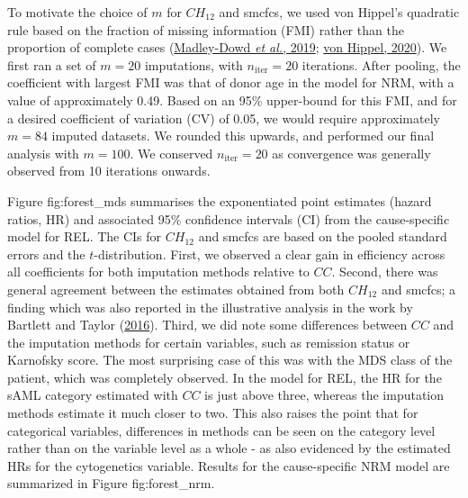 \documentclass[
  letterpaper,
  DIV=11,
  numbers=noendperiod]{scrreprt}
\begin{document}
To motivate the choice of \(m\) for \(CH_{12}\) and smcfcs, we used von
Hippel's quadratic rule based on the fraction of missing information
(FMI) rather than the proportion of complete cases
(\protect\hyperlink{ref-madley-dowdProportionMissingData2019}{Madley-Dowd
\emph{et al.}, 2019};
\protect\hyperlink{ref-vonhippelHowManyImputations2020}{von Hippel,
2020}). We first ran a set of \(m = 20\) imputations, with
\(n_{\text{iter}} = 20\) iterations. After pooling, the coefficient with
largest FMI was that of donor age in the model for NRM, with a value of
approximately 0.49. Based on an 95\% upper-bound for this FMI, and for a
desired coefficient of variation (CV) of 0.05, we would require
approximately \(m = 84\) imputed datasets. We rounded this upwards, and
performed our final analysis with \(m = 100\). We conserved
\(n_{\text{iter}} = 20\) as convergence was generally observed from 10
iterations onwards.

Figure fig:forest\_mds summarises the exponentiated point estimates
(hazard ratios, HR) and associated 95\% confidence intervals (CI) from
the cause-specific model for REL. The CIs for \(CH_{12}\) and smcfcs are
based on the pooled standard errors and the \(t\)-distribution. First,
we observed a clear gain in efficiency across all coefficients for both
imputation methods relative to \(CC\). Second, there was general
agreement between the estimates obtained from both \(CH_{12}\) and
smcfcs; a finding which was also reported in the illustrative analysis
in the work by Bartlett and Taylor
(\protect\hyperlink{ref-bartlettMissingCovariatesCompeting2016}{2016}).
Third, we did note some differences between \(CC\) and the imputation
methods for certain variables, such as remission status or Karnofsky
score. The most surprising case of this was with the MDS class of the
patient, which was completely observed. In the model for REL, the HR for
the sAML category estimated with \(CC\) is just above three, whereas the
imputation methods estimate it much closer to two. This also raises the
point that for categorical variables, differences in methods can be seen
on the category level rather than on the variable level as a whole - as
also evidenced by the estimated HRs for the cytogenetics variable.
Results for the cause-specific NRM model are summarized in Figure
fig:forest\_nrm.
\end{document}
